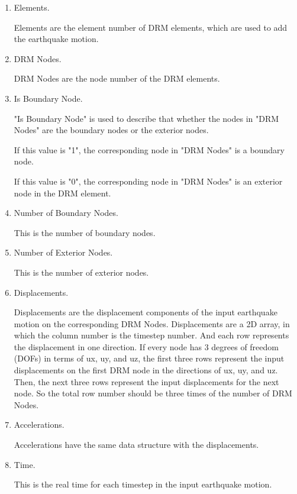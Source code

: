 \documentclass[fleqn,11pt]{article}
\begin{document}
\begin{enumerate}
  \item Elements. 
  
  Elements are the element number of DRM elements, which are used to add the earthquake motion. 

  \item DRM Nodes. 
  
  DRM Nodes are the node number of the DRM elements. 

  \item Is Boundary Node. 

  "Is Boundary Node" is used to describe that whether the nodes in "DRM Nodes" are the boundary nodes or the exterior nodes.

  If this value is "1", the corresponding node in "DRM Nodes" is a boundary node.

  If this value is "0", the corresponding node in  "DRM Nodes" is an exterior node in the DRM element.

  \item Number of Boundary Nodes. 

  This is the number of boundary nodes.

  \item Number of Exterior Nodes. 

  This is the number of exterior nodes.

  \item Displacements. 

  Displacements are the displacement components of the input earthquake motion on the corresponding DRM Nodes. Displacements are a 2D array, in which the column number is the timestep number. And each row represents the displacement in one direction. If every node has 3 degrees of freedom (DOFs) in terms of ux, uy, and uz, the first three rows represent the input displacements on the first DRM node in the directions of ux, uy, and uz. Then, the next three rows represent the input displacements for the next node. So the total row number should be three times of the number of DRM Nodes.

  \item Accelerations. 

  Accelerations have the same data structure with the displacements. 
  
  \item Time. 

  This is the real time for each timestep in the input earthquake motion. 


\end{enumerate}
\end{document}
